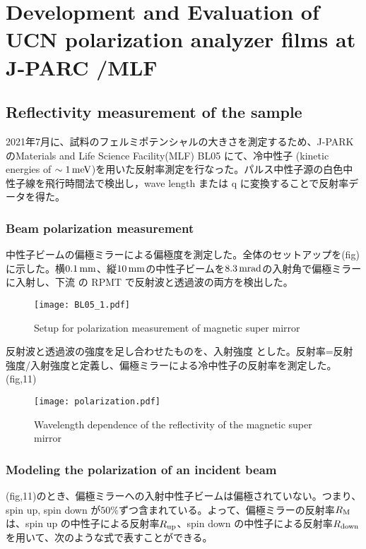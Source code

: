 \documentclass[onecolumn]{preport}
\begin{document}
\section{Development and Evaluation of UCN polarization analyzer films at J-PARC /MLF}
\subsection{Reflectivity measurement of the sample}
2021年7月に、試料のフェルミポテンシャルの大きさを測定するため、J-PARKのMaterials and Life Science Facility(MLF) BL05 にて、冷中性子 (kinetic
 energies of $\sim 1 \,\rm meV$)を用いた反射率測定を行なった。パルス中性子源の白色中性子線を飛行時間法で検出し，wave length または q に変換することで反射率データを得た。
 
\subsubsection{Beam polarization measurement}

中性子ビームの偏極ミラーによる偏極度を測定した。全体のセットアップを(fig)に示した。横$0.1\,\rm mm$、縦$10\,\rm mm$の中性子ビームを$8.3\,\rm mrad$の入射角で偏極ミラーに入射し、下流 の RPMT で反射波と透過波の両方を検出した。
\begin{figure}[tbh]
 \centering
 \texttt{[image: BL05\_1.pdf]}
 \caption{Setup for polarization measurement of magnetic super mirror}
\end{figure}
反射波と透過波の強度を足し合わせたものを、入射強度
とした。反射率=反射強度/入射強度と定義し、偏極ミラーによる冷中性子の反射率を測定した。(fig,11)

\begin{figure}[tbh]
 \centering
 \texttt{[image: polarization.pdf]}
 \caption{Wavelength dependence of the reflectivity of the magnetic super mirror}
\end{figure}

\subsubsection{Modeling the polarization of an incident beam}

(fig,11)のとき、偏極ミラーへの入射中性子ビームは偏極されていない。つまり、spin up, spin down
が$50\%$ずつ含まれている。よって、偏極ミラーの反射率$R_{\rm M}$は、spin up の中性子による反射率$R_{\rm up}$、spin down の中性子による反射率$R_{\rm down}$を用いて、次のような式で表すことができる。
\end{document}
